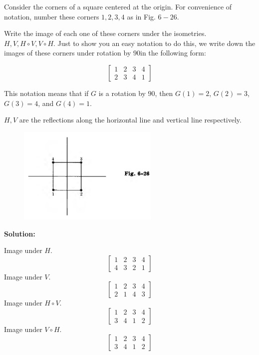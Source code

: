 \begin{tcolorbox}[title=Problem 9, breakable]
    Consider the corners of a square centered at the origin.
    For convenience of notation, number these corners $1, 2, 3, 4$ as in Fig. $6-26$.

    Write the image of each one of these corners under the isometries.
    $H, V, H \circ V, V \circ H$. Just to show you an easy notation to 
    do this, we write down the images of these corners under rotation by 
    $90$\textdegree in the following form:

    \[
    \begin{bmatrix}
    1 & 2 & 3 & 4 \\
    2 & 3 & 4 & 1
    \end{bmatrix}
    \]

    This notation means that if $G$ is a rotation by $90$\textdegree,
    then $G(1) = 2$, $G(2) = 3$, $G(3) = 4$, and $G(4) = 1$.

    $H, V$ are the reflections along the horizontal line 
        and vertical line respectively.
\end{tcolorbox}

\begin{figure}[h]
    \centering
    \includegraphics[width=0.6\textwidth]{images/square.png}
\end{figure}

\textbf{Solution:}

Image under $H$.
\[
\begin{bmatrix}
1 & 2 & 3 & 4 \\
4 & 3 & 2 & 1
\end{bmatrix}
\]
Image under $V$.
\[
\begin{bmatrix}
1 & 2 & 3 & 4 \\
2 & 1 & 4 & 3
\end{bmatrix}
\]
Image under $H \circ V$.
\[
\begin{bmatrix}
1 & 2 & 3 & 4 \\
3 & 4 & 1 & 2
\end{bmatrix}
\]
Image under $V \circ H$.
\[
\begin{bmatrix}
1 & 2 & 3 & 4 \\
3 & 4 & 1 & 2
\end{bmatrix}
\]

